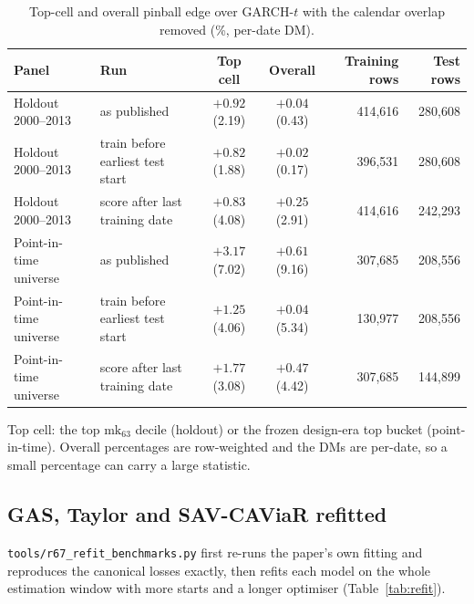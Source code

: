 \documentclass[11pt]{article}
\begin{document}
\begin{table}[htbp]\centering\begin{threeparttable}
\caption{Top-cell and overall pinball edge over GARCH-$t$ with the calendar overlap removed (\%, per-date DM).}\label{tab:strict}\footnotesize
\begin{tabular}{llccrr}\toprule
Panel & Run & Top cell & Overall & Training rows & Test rows \\ \midrule
Holdout 2000--2013 & as published & $+0.92$ (2.19) & $+0.04$ (0.43) & 414,616 & 280,608 \\
Holdout 2000--2013 & train before earliest test start & $+0.82$ (1.88) & $+0.02$ (0.17) & 396,531 & 280,608 \\
Holdout 2000--2013 & score after last training date & $+0.83$ (4.08) & $+0.25$ (2.91) & 414,616 & 242,293 \\
\midrule
Point-in-time universe & as published & $+3.17$ (7.02) & $+0.61$ (9.16) & 307,685 & 208,556 \\
Point-in-time universe & train before earliest test start & $+1.25$ (4.06) & $+0.04$ (5.34) & 130,977 & 208,556 \\
Point-in-time universe & score after last training date & $+1.77$ (3.08) & $+0.47$ (4.42) & 307,685 & 144,899 \\
\bottomrule\end{tabular}
\begin{tablenotes}\footnotesize\item Top cell: the top $\mathrm{mk}_{63}$ decile (holdout) or the frozen design-era top bucket (point-in-time). Overall percentages are row-weighted and the DMs are per-date, so a small percentage can carry a large statistic.\end{tablenotes}
\end{threeparttable}\end{table}

\subsection*{GAS, Taylor and SAV-CAViaR refitted}
\texttt{tools/r67\_refit\_benchmarks.py} first re-runs the paper's own fitting and reproduces the canonical losses exactly, then refits each model on the whole estimation window with more starts and a longer optimiser (Table~\ref{tab:refit}).
\end{document}
